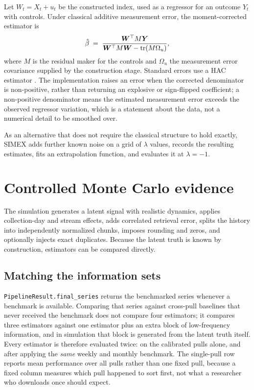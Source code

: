 \documentclass[12pt,a4paper,oneside]{article}
\begin{document}
Let $W_t = X_t + u_t$ be the constructed index, used as a regressor for an
outcome $Y_t$ with controls. Under classical additive measurement error, the
moment-corrected estimator is
\begin{equation}
\hat{\beta} \;=\;
\frac{\bm{W}^{\top}M\bm{Y}}
{\bm{W}^{\top}M\bm{W} - \operatorname{tr}(M\Omega_u)},
\label{eq:rc-ols}
\end{equation}
where $M$ is the residual maker for the controls and $\Omega_u$ the measurement
error covariance supplied by the construction stage. Standard errors use a HAC
estimator \citep{NeweyWest1987}. The implementation raises an error when the
corrected denominator is non-positive, rather than returning an
explosive or sign-flipped coefficient; a non-positive denominator means the
estimated measurement error exceeds the observed regressor variation, which is a
statement about the data, not a numerical detail to be smoothed over.

As an alternative that does not require the classical structure to hold exactly,
SIMEX \citep{CookStefanski1994,Carroll2006} adds further known noise on a grid
of $\lambda$ values, records the resulting estimates, fits an extrapolation
function, and evaluates it at $\lambda = -1$.

\section{Controlled Monte Carlo evidence}\label{sec:monte-carlo}

The simulation generates a latent signal with realistic dynamics, applies
collection-day and stream effects, adds correlated retrieval error, splits the
history into independently normalized chunks, imposes rounding and zeros, and
optionally injects exact duplicates. Because the latent truth is known by
construction, estimators can be compared directly.

\subsection{Matching the information sets}

\texttt{PipelineResult.final\_series} returns the benchmarked series whenever a
benchmark is available. Comparing that series against cross-pull baselines that
never received the benchmark does not compare four estimators; it compares three
estimators against one estimator plus an extra block of low-frequency
information, and in simulation that block is generated from the latent truth
itself. Every estimator is therefore evaluated twice: on the calibrated pulls
alone, and after applying the \emph{same} weekly and monthly benchmark. The
single-pull row reports mean performance over all pulls rather than one fixed
pull, because a fixed column measures which pull happened to sort first, not
what a researcher who downloads once should expect.
\end{document}
